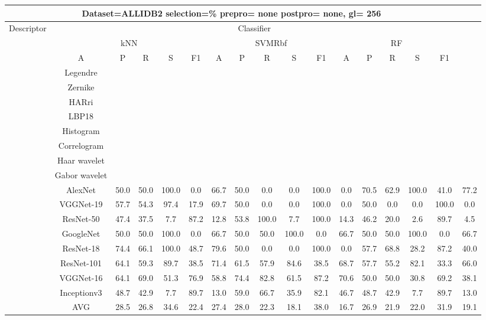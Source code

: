 \documentclass[12pt,italian]{article}
\begin{document}
\begin{tiny}
 \pagebreak 
\begin{longtable}{lcccccccccccccccc}
\toprule
\multicolumn{16}{c}{Dataset=ALLIDB2 selection=\% prepro= none postpro= none, gl= 256} \\ 
\toprule
Descriptor & \multicolumn{15}{c}{Classifier} \\ 
& \multicolumn{5}{c}{kNN} & \multicolumn{5}{c}{SVMRbf} & \multicolumn{5}{c}{RF} \\ 
& A & P & R & S & F1 & A & P & R & S & F1 & A & P & R & S & F1 \\ 
\midrule
& Legendre \\ 
& Zernike \\ 
& HARri \\ 
& LBP18 \\ 
& Histogram \\ 
& Correlogram \\ 
& Haar wavelet \\ 
& Gabor wavelet \\ 
& AlexNet & 50.0 & 50.0 & 100.0 &  0.0 & 66.7 & 50.0 &  0.0 &  0.0 & 100.0 &  0.0 & 70.5 & 62.9 & 100.0 & 41.0 & 77.2 \\ 
& VGGNet-19 & 57.7 & 54.3 & 97.4 & 17.9 & 69.7 & 50.0 &  0.0 &  0.0 & 100.0 &  0.0 & 50.0 &  0.0 &  0.0 & 100.0 &  0.0 \\ 
& ResNet-50 & 47.4 & 37.5 &  7.7 & 87.2 & 12.8 & 53.8 & 100.0 &  7.7 & 100.0 & 14.3 & 46.2 & 20.0 &  2.6 & 89.7 &  4.5 \\ 
& GoogleNet & 50.0 & 50.0 & 100.0 &  0.0 & 66.7 & 50.0 & 50.0 & 100.0 &  0.0 & 66.7 & 50.0 & 50.0 & 100.0 &  0.0 & 66.7 \\ 
& ResNet-18 & 74.4 & 66.1 & 100.0 & 48.7 & 79.6 & 50.0 &  0.0 &  0.0 & 100.0 &  0.0 & 57.7 & 68.8 & 28.2 & 87.2 & 40.0 \\ 
& ResNet-101 & 64.1 & 59.3 & 89.7 & 38.5 & 71.4 & 61.5 & 57.9 & 84.6 & 38.5 & 68.7 & 57.7 & 55.2 & 82.1 & 33.3 & 66.0 \\ 
& VGGNet-16 & 64.1 & 69.0 & 51.3 & 76.9 & 58.8 & 74.4 & 82.8 & 61.5 & 87.2 & 70.6 & 50.0 & 50.0 & 30.8 & 69.2 & 38.1 \\ 
& Inceptionv3 & 48.7 & 42.9 &  7.7 & 89.7 & 13.0 & 59.0 & 66.7 & 35.9 & 82.1 & 46.7 & 48.7 & 42.9 &  7.7 & 89.7 & 13.0 \\ 
\hline
& AVG & 28.5 & 26.8 & 34.6 & 22.4 & 27.4 & 28.0 & 22.3 & 18.1 & 38.0 & 16.7 & 26.9 & 21.9 & 22.0 & 31.9 & 19.1 \\ 
\hline
\bottomrule
\end{longtable} 

 \pagebreak 
\end{tiny} 
 
\end{document}
